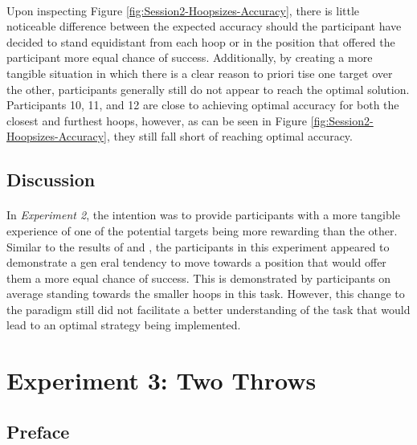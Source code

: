 \documentclass[12pt]{article}
\begin{document}
\paragraph{} Upon inspecting Figure \ref{fig:Session2-Hoopsizes-Accuracy}, there is little noticeable difference between the expected accuracy should the participant have decided to stand equidistant from each hoop or in the position that offered the participant more equal chance of success. Additionally, by creating a more tangible situation in which there is a clear reason to priori tise one target over the other, participants generally still do not appear to reach the optimal solution. Participants 10, 11, and 12 are close to achieving optimal accuracy for both the closest and furthest hoops, however, as can be seen in Figure \ref{fig:Session2-Hoopsizes-Accuracy}, they still fall short of reaching optimal accuracy. 

\subsection*{Discussion}

\paragraph{} In \textit{Experiment 2}, the intention was to provide participants with a more tangible experience of one of the potential targets being more rewarding than the other. Similar to the results of \cite{CHAPMAN2010168} and \cite{Hudson2007probmove}, the participants in this experiment appeared to demonstrate a gen eral tendency to move towards a position that would offer them a more equal chance of success. This is demonstrated by participants on average standing towards the smaller hoops in this task. However, this change to the paradigm still did not facilitate a better understanding of the task that would lead to an optimal strategy being implemented. 


\section*{Experiment 3: Two Throws}

\subsection*{Preface}
\end{document}
